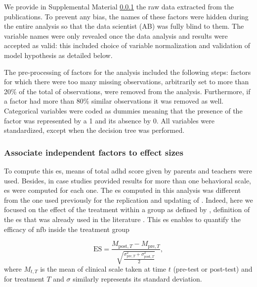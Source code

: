 We provide in Supplemental Material \ref{} the raw data extracted from the publications. To prevent any bias, the names of these factors
were hidden during the entire analysis so that the data scientist (AB) was fully blind to them. The variable names were only revealed once the data 
analysis and results were accepted as valid: this included choice of variable normalization and validation of model hypothesis as detailed below.

The pre-processing of factors for the analysis included the following steps: factors for which there were too many missing observations, 
arbitrarily set to more than 20\% of the total of observations, were removed from the analysis. Furthermore, if a factor had more than 
80\% similar observations it was removed as well. Categorical variables were coded as dummies meaning that the presence of the factor was represented by a 1 
and its absence by 0. All variables were standardized, except when the decision tree was performed. 


\subsubsection{Associate independent factors to effect sizes}

To compute this \gls{es}, means of total \gls{adhd} score given by parents and teachers were used. Besides, in case studies provided results 
for more than one behavioral scale, \gls{es} were computed for each one. The \gls{es} computed in this analysis was different from the one 
used previously for the replication and updating of \citet{Cortese2016}. Indeed, here we focused on the effect of the treatment within 
a group as defined by \citet{Cohen1988}, definition of the \gls{es} that was already used in the literature \citep{Arns2009, Maurizio2014, 
Strehl2017}. This \gls{es} enables to quantify the efficacy of \gls{nfb} inside the treatment group 

\begin{equation}
\label{eq:factors_effect_size_within_subject}
\text{ES} = \frac{M_{\text{post},T} - M_{\text{pre},T}}{\sqrt{\frac{\sigma_{\text{pre},T}^2 + \sigma_{\text{post},T}^2}{2}}},
\end{equation} 
where $M_{t,T}$ is the mean of clinical scale taken at time $t$ (pre-test or post-test) and for treatment $T$ and $\sigma$ similarly represents its standard deviation.

